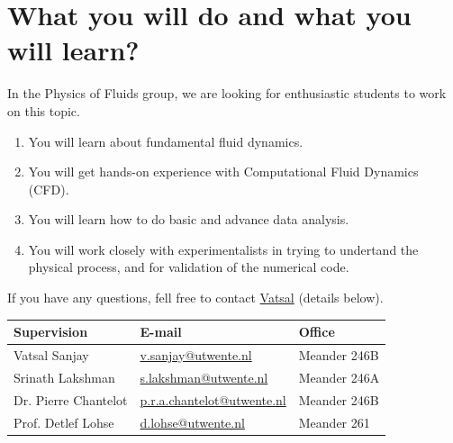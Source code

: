 \documentclass[a4paper,10pt]{article}
\begin{document}
\section*{What you will do and what you will learn?}
In the Physics of Fluids group, we are looking for enthusiastic students to work on this topic.
\begin{enumerate}
\itemsep0em
\item You will learn about fundamental fluid dynamics.
\item You will get hands-on experience with Computational Fluid Dynamics (CFD).
\item You will learn how to do basic and advance data analysis.
\item You will work closely with experimentalists in trying to undertand the physical process, and for validation of the numerical code.
\end{enumerate}
If you have any questions, fell free to contact \href{mailto:v.sanjay@utwente.nl}{Vatsal} (details below).
\begin{center}
\begin{tabular}{|l|l|l|}
\hline \textbf{Supervision} & \textbf{E-mail} & \textbf{Office} \\
\hline Vatsal Sanjay & \href{mailto:v.sanjay@utwente.nl}{v.sanjay@utwente.nl} & Meander 246B \\
\hline Srinath Lakshman   & \href{mailto:s.lakshman@utwente.nl}{s.lakshman@utwente.nl}& Meander 246A \\
\hline Dr. Pierre Chantelot   & \href{mailto:p.r.a.chantelot@utwente.nl}{p.r.a.chantelot@utwente.nl}& Meander 246B \\
\hline Prof. Detlef Lohse & \href{mailto:d.lohse@utwente.nl}{d.lohse@utwente.nl} & Meander 261  \\
\hline
\end{tabular}
\end{center}
\printbibliography
\end{document}
